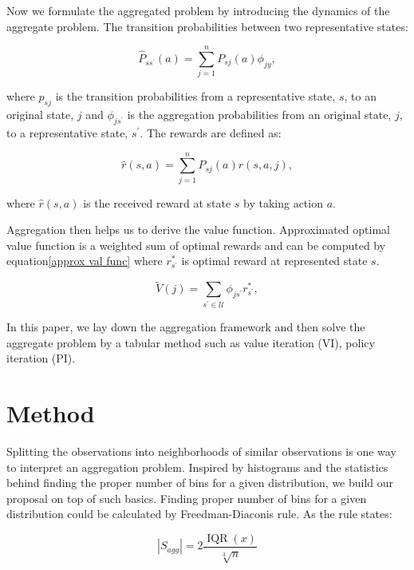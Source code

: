 \documentclass{article}
\begin{document}
    Now we formulate the aggregated problem by introducing the dynamics of the aggregate problem.
    The transition probabilities between
    two representative states:

    \begin{equation}
        \hat{P}_{s s^\prime}(a)=\sum_{j=1}^{n} P_{s j}(a) \phi_{j y},
    \end{equation}

    where $p_ {s j}$ is the transition probabilities from a representative state, $s$, to an original state, $j$
    and $\phi_{j s^\prime}$ is the aggregation probabilities from an original state, $j$, to a representative state,
    $s^\prime$.
    The rewards are defined as:

    \begin{equation}
        \hat{r}(s, a)=\sum_{j=1}^{n} P_{s j}(a) r(s, a, j),
    \end{equation}

    where $\hat{r}(s, a)$ is the received reward at state $s$ by taking action $a$.


    Aggregation then helps us to derive the value function.
    Approximated optimal value function is a weighted sum of optimal rewards and can be computed by
    equation\ref{approx val func} where $r_{s^\prime}^{\ast}$ is optimal reward at represented state $s$.

    \begin{equation}
        \label{approx val func}
        \tilde{V}(j)=\sum_{s^\prime \in \mathcal{U}} \phi_{j s^\prime} r_{s^\prime}^{\ast},
    \end{equation}

    In this paper, we lay down the aggregation framework and then solve the aggregate problem by a tabular method
    such as value iteration (VI), policy iteration (PI).


    \section{Method}
    Splitting the observations into neighborhoods of similar observations is one way to interpret an aggregation
    problem.
    Inspired by histograms and the statistics behind finding the proper number of bins for a given distribution, we
    build our proposal on top of such basics.
    Finding proper number of bins for a given distribution could be calculated by Freedman-Diaconis rule. As the rule
    states:

    \begin{equation}
        |S_{agg}| = 2 \frac{\operatorname{IQR}(x)}{\sqrt[3]{n}}
    \end{equation}
\end{document}
